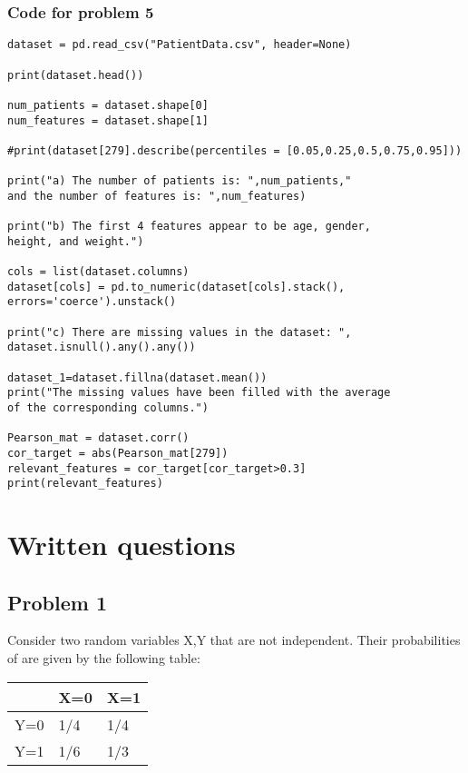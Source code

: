 \documentclass[12pt]{article}%
\begin{document}
\subsubsection{Code for problem 5}
\begin{lstlisting}
dataset = pd.read_csv("PatientData.csv", header=None)

print(dataset.head())

num_patients = dataset.shape[0]
num_features = dataset.shape[1]

#print(dataset[279].describe(percentiles = [0.05,0.25,0.5,0.75,0.95]))

print("a) The number of patients is: ",num_patients,"
and the number of features is: ",num_features)

print("b) The first 4 features appear to be age, gender,
height, and weight.")

cols = list(dataset.columns) 
dataset[cols] = pd.to_numeric(dataset[cols].stack(),
errors='coerce').unstack()

print("c) There are missing values in the dataset: ",
dataset.isnull().any().any())

dataset_1=dataset.fillna(dataset.mean())
print("The missing values have been filled with the average
of the corresponding columns.")

Pearson_mat = dataset.corr()
cor_target = abs(Pearson_mat[279])
relevant_features = cor_target[cor_target>0.3]
print(relevant_features)
\end{lstlisting}


\section{Written questions}

\subsection{Problem 1}

Consider two random variables X,Y that are not independent. Their probabilities of are given by the following table:

\begin{table}[!h]
\centering
\begin{tabular}{|l|l|l|}
\hline
    & X=0 & X=1 \\ \hline
Y=0 & 1/4 & 1/4 \\ \hline
Y=1 & 1/6 & 1/3 \\ \hline
\end{tabular}
\end{table}
\end{document}
